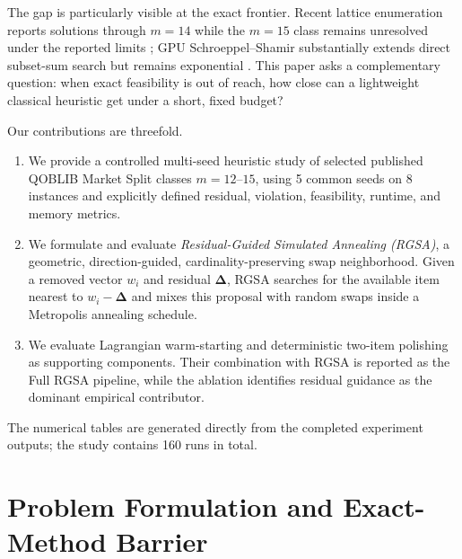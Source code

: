 \documentclass[11pt]{article}
\newcommand{\res}{\boldsymbol{\Delta}}
\begin{document}
The gap is particularly visible at the exact frontier. Recent lattice enumeration reports solutions through $m=14$ while the $m=15$ class remains unresolved under the reported limits \cite{wassermann2026}; GPU Schroeppel--Shamir substantially extends direct subset-sum search but remains exponential \cite{kempkekoch2026}. This paper asks a complementary question: when exact feasibility is out of reach, how close can a lightweight classical heuristic get under a short, fixed budget?

Our contributions are threefold.
\begin{enumerate}
  \item We provide a controlled multi-seed heuristic study of selected published QOBLIB Market Split classes $m=12$--$15$, using 5 common seeds on 8 instances and explicitly defined residual, violation, feasibility, runtime, and memory metrics.
  \item We formulate and evaluate \emph{Residual-Guided Simulated Annealing (RGSA)}, a geometric, direction-guided, cardinality-preserving swap neighborhood. Given a removed vector $w_i$ and residual $\res$, RGSA searches for the available item nearest to $w_i-\res$ and mixes this proposal with random swaps inside a Metropolis annealing schedule.
  \item We evaluate Lagrangian warm-starting and deterministic two-item polishing as supporting components. Their combination with RGSA is reported as the Full RGSA pipeline, while the ablation identifies residual guidance as the dominant empirical contributor.
\end{enumerate}

The numerical tables are generated directly from the completed experiment outputs; the study contains 160 runs in total.

\section{Problem Formulation and Exact-Method Barrier}\label{sec:problem}
\end{document}
